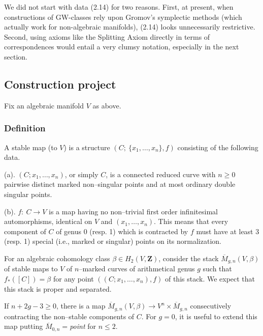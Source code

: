 \documentclass[reqno]{amsart}
\theoremstyle{definition}
\begin{document}
\smallskip

We did not start with data (2.14) for two reasons. First, at present,
when constructions of GW-classes rely upon Gromov's symplectic
methods (which actually work for non-algebraic manifolds),
(2.14) looks unnecessarily restrictive. Second, using axioms
like the Splitting Axiom directly in terms of correspondences would entail a
very clumsy
notation, especially in the next section.


\subsection{Construction project}
Fix an algebraic manifold $V$ as above.


\subsubsection{Definition}

  A stable map (to $V$) is a structure
  $(C;\ \{ x_1,\dots ,x_n\} ,f)$ consisting of the following data.

  \smallskip

  (a). $(C; x_1,\dots ,x_n)$,
  or simply $C$, is a connected
  reduced curve with $n\ge 0$ pairwise distinct
  marked non--singular points and at most
  ordinary double singular points.

  \smallskip

  (b). $f:\ C\to V$ is a map
  having no non--trivial first order infinitesimal automorphisms, identical
  on $V$ and $(x_1,\dots ,x_n)$. This means that every component
  of $C$ of genus 0 (resp. 1) which is contracted by $f$ must
  have at least 3 (resp. 1) special (i.e., marked or singular) points
  on its normalization.


For an algebraic cohomology class $\beta \in H_2(V,\mathbf{Z})$,
consider the stack ${\overline{M}}_{g,n}(V,\beta)$ of stable
maps to $V$ of $n$--marked curves of arithmetical genus $g$
such that $f_*([C])=\beta $ for any point $((C; x_1,\dots ,x_n),f)$
of this stack. We expect that this stack is proper and separated.


If $n+2g-3\ge 0$,
there is a map ${\overline{M}}_{g,n}(V,\beta )\to
V^n\times {\overline{M}}_{g,n}$ consecutively contracting the non--stable
components of $C$. For $g=0$, it is useful to extend this map
putting ${\overline{M}}_{0,n}=${\it point} for $n\le 2$.
\end{document}
